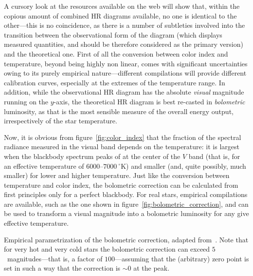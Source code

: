 A cursory look at the resources available on the web will show that, within the
copious amount of combined HR diagrams available, no one is identical to the
other---this is no coincidence, as there is a number of subtleties involved into
the transition between the observational form of the diagram (which displays
measured quantities, and should be therefore considered as the primary version)
and the theoretical one. First of all the conversion between color index and
temperature, beyond being highly non linear, comes with significant uncertainties
owing to its purely empirical nature---different compilations will provide different
calibration curves, especially at the extremes of the temperature range.
In addition, while the observational HR diagram has the absolute \emph{visual}
magnitude running on the $y$-axis, the theoretical HR diagram is best re-casted
in \emph{bolometric} luminosity, as that is the most sensible measure of the overall
energy output, irrespectively of the star temperature.

Now, it is obvious from figure~\ref{fig:color_index} that the fraction of the spectral
radiance measured in the visual band depends on the temperature: it is largest when
the blackbody spectrum peaks of at the center of the $V$ band (that is, for an effective
temperature of $6000$--$7000~^\circ$K) and smaller (and, quite possibly, much smaller)
for lower and higher temperature. Just like the conversion between temperature
and color index, the bolometric correction can be calculated from first principles
only for a perfect blackbody. For real stars, empirical compilations are available,
such as the one shown in figure~\ref{fig:bolometric_correction}, and can be used
to transform a visual magnitude into a bolometric luminosity for any give effective
temperature.

\begin{marginfigure}
    
    \caption{Empirical parametrization of the bolometric correction, adapted
      from~\cite{1998JRASC..92...36R}. Note that for very hot and very cold
      stars the bolometric correction can exceed $5$~magnitudes---that is, a factor
      of $100$---assuming that the (arbitrary) zero point is set in such a way
      that the correction is $\sim 0$ at the peak.}
    \label{fig:bolometric_correction}
\end{marginfigure}

